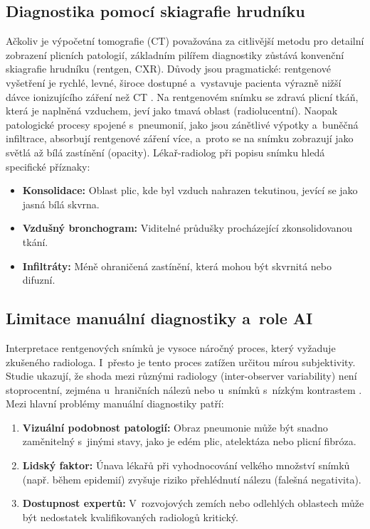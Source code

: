 \documentclass[12pt, a4paper]{report}
\begin{document}
\subsection{Diagnostika pomocí skiagrafie hrudníku}
Ačkoliv je výpočetní tomografie (CT) považována za citlivější metodu pro detailní zobrazení plicních patologií, základním pilířem diagnostiky zůstává konvenční skiagrafie hrudníku (rentgen, CXR).
Důvody jsou pragmatické: rentgenové vyšetření je rychlé, levné, široce dostupné a~vystavuje pacienta výrazně nižší dávce ionizujícího záření než CT \cite{chest_xray_diagnosis}.
Na rentgenovém snímku se zdravá plicní tkáň, která je naplněná vzduchem, jeví jako tmavá oblast (radiolucentní).
Naopak patologické procesy spojené s~pneumonií, jako jsou zánětlivé výpotky a~buněčná infiltrace, absorbují rentgenové záření více, a~proto se na snímku zobrazují jako světlá až bílá zastínění (opacity).
Lékař-radiolog při popisu snímku hledá specifické příznaky:
\begin{itemize}
    \item \textbf{Konsolidace:} Oblast plic, kde byl vzduch nahrazen tekutinou, jevící se jako jasná bílá skvrna.
    \item \textbf{Vzdušný bronchogram:} Viditelné průdušky procházející zkonsolidovanou tkání.
    \item \textbf{Infiltráty:} Méně ohraničená zastínění, která mohou být skvrnitá nebo difuzní.
\end{itemize}

\subsection{Limitace manuální diagnostiky a~role AI}
Interpretace rentgenových snímků je vysoce náročný proces, který vyžaduje zkušeného radiologa.
I~přesto je tento proces zatížen určitou mírou subjektivity. Studie ukazují, že shoda mezi různými radiology (inter-observer variability) není stoprocentní, zejména u~hraničních nálezů nebo u~snímků s~nízkým kontrastem \cite{radiologist_error_rate}.
Mezi hlavní problémy manuální diagnostiky patří:
\begin{enumerate}
    \item \textbf{Vizuální podobnost patologií:} Obraz pneumonie může být snadno zaměnitelný s~jinými stavy, jako je edém plic, atelektáza nebo plicní fibróza.
    \item \textbf{Lidský faktor:} Únava lékařů při vyhodnocování velkého množství snímků (např. během epidemií) zvyšuje riziko přehlédnutí nálezu (falešná negativita).
    \item \textbf{Dostupnost expertů:} V~rozvojových zemích nebo odlehlých oblastech může být nedostatek kvalifikovaných radiologů kritický.
\end{enumerate}
\end{document}

